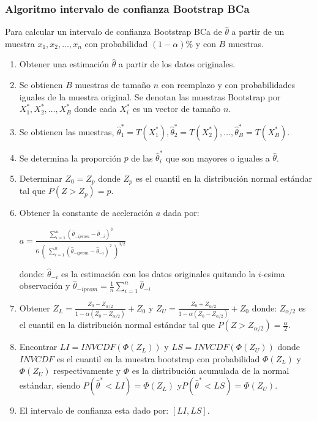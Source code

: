 \subsubsection{Algoritmo intervalo de confianza Bootstrap BCa}

Para calcular un intervalo de confianza Bootstrap BCa de $\hat{\theta}$ a partir de un muestra $x_{1}, x_{2}, \dots, x_{n}$ con probabilidad $(1-\alpha)$\% y con $B$ muestras.


\begin{enumerate}
 \item Obtener una estimación $\hat{\theta}$ a partir de los datos originales.
 
\item Se obtienen $B$ muestras de tamaño $n$ con reemplazo y con probabilidades iguales de la muestra original. Se denotan las muestras Bootstrap por $X^{*}_{1}, X^{*}_{2},  \dots, X^{*}_{B}$ donde cada $X^{*}_{i}$ es un vector de tamaño $n$.

\item Se obtienen las muestras, $\hat{\theta}^{*}_{1} = T (X^{*}_{1}) , \hat{\theta}^{*}_{2} = T (X^{*}_{2}), \dots,\hat{\theta}^{*}_{B} = T (X^{*}_{B})$.

\item Se determina la proporción $p$ de las  $\hat{\theta}^{*}_{i}$ que son mayores o iguales a $\hat{\theta}$.

\item  Determinar $Z_{0} = Z_{p}$ donde $Z_{p}$ es el cuantil en la distribución normal estándar tal que $P(Z > Z_{p}) = p$.

\item  Obtener la constante de aceleración $a$ dada por:
\begin{center}
 \Large $ a = \frac{\sum_{i=1}^{n}  (\hat{\theta}_{-iprom}  - \hat{\theta}_{-i})^{3} }{ 6 \; (\; \sum_{i=1}^{n}  ( \hat{\theta}_{-iprom}  - \hat{\theta}_{-i})^{2} \; )^{3/2}} $
\end{center}

 donde: $\hat{\theta}_{-i}$ es la estimación con los datos originales quitando la $i$-esima observación y {\normalsize $\hat{\theta}_{-iprom} = \frac{1}{n} \sum_{i=1}^{n}\hat{\theta}_{-i}$}
 
 \item Obtener {\large $Z_{L} = \frac{Z_{0} - Z_{\alpha/2}}{ 1- \alpha ( Z_{0} - Z_{\alpha/2})} + Z_{0}  $}   y {\large $Z_{U} = \frac{Z_{0} + Z_{\alpha/2}}{ 1- \alpha ( Z_{0} - Z_{\alpha/2})} + Z_{0}  $}  donde: $Z_{\alpha /2}$ es el cuantil en la
 distribución normal estándar tal que $P(Z > Z_{\alpha / 2}) = \frac{\alpha}{2}$.
 
 
 \item Encontrar $LI = INVCDF( \Phi(Z_{L}))$ y $LS = INVCDF( \Phi(Z_{U}))$ donde $INVCDF$ es el cuantil en la muestra bootstrap con probabilidad $ \Phi(Z_{L})$ y $ \Phi(Z_{U})$ respectivamente y $\Phi$ es la distribución acumulada de la normal estándar, siendo $P(\hat{\theta}^{*} < LI) = \Phi(Z_{L})$ y$P(\hat{\theta}^{*} < LS) = \Phi(Z_{U})$.
 
\item El intervalo de confianza esta dado por: $[LI, LS]$.
\end{enumerate}


